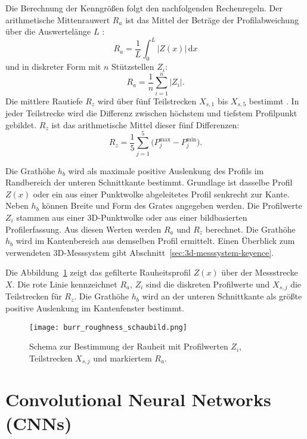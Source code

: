 Die Berechnung der Kenngrößen folgt den nachfolgenden Rechenregeln. Der arithmetische Mittenrauwert \(R_a\) ist das Mittel der Beträge der Profilabweichung über die Auswertelänge \(L\) \parencite{MitutoyoQuickGuide}:
\[
R_a=\frac{1}{L}\int_{0}^{L}\lvert Z(x)\rvert\,\mathrm{d}x
\]
und in diskreter Form mit \(n\) Stützstellen \(Z_i\):
\[
R_a=\frac{1}{n}\sum_{i=1}^{n}\lvert Z_i\rvert.
\]
Die mittlere Rautiefe \(R_z\) wird über fünf Teilstrecken \(X_{s,1}\) bis \(X_{s,5}\) bestimmt \parencite{KeyenceISO4287}. In jeder Teilstrecke wird die Differenz zwischen höchstem und tiefstem Profilpunkt gebildet. \(R_z\) ist das arithmetische Mittel dieser fünf Differenzen:
\[
R_z=\frac{1}{5}\sum_{j=1}^{5}\bigl(P^{\max}_{j}-P^{\min}_{j}\bigr).
\]

Die Grathöhe \(h_b\) wird als maximale positive Auslenkung des Profils im Randbereich der unteren Schnittkante bestimmt. Grundlage ist dasselbe Profil \(Z(x)\) oder ein aus einer Punktwolke abgeleitetes Profil senkrecht zur Kante. Neben \(h_b\) können Breite und Form des Grates angegeben werden.
Die Profilwerte \(Z_i\) stammen aus einer 3D-Punktwolke oder aus einer bildbasierten Profilerfassung. Aus diesen Werten werden \(R_a\) und \(R_z\) berechnet. Die Grathöhe \(h_b\) wird im Kantenbereich aus demselben Profil ermittelt. Einen Überblick zum verwendeten 3D-Messsystem gibt Abschnitt~\ref{sec:3d-messsystem-keyence}.

Die Abbildung~\ref{fig:roughness-profile} zeigt das gefilterte Rauheitsprofil \(Z(x)\) über der Messstrecke \(X\).
Die rote Linie kennzeichnet \(R_a\), \(Z_i\) sind die diskreten Profilwerte und \(X_{s,j}\) die Teilstrecken für \(R_z\). Die Grathöhe \(h_b\) wird an der unteren Schnittkante als größte positive Auslenkung im Kantenfenster bestimmt.

\begin{figure}[htbp]
  \centering
  \texttt{[image: burr\_roughness\_schaubild.png]}
  \caption[Schema zur Bestimmung der Rauheit]{Schema zur Bestimmung der Rauheit mit Profilwerten \(Z_i\), Teilstrecken \(X_{s,j}\) und markiertem \(R_a\).}
  \label{fig:roughness-profile}
\end{figure}

\section{Convolutional Neural Networks (CNNs)}
\label{sec:cnns}

